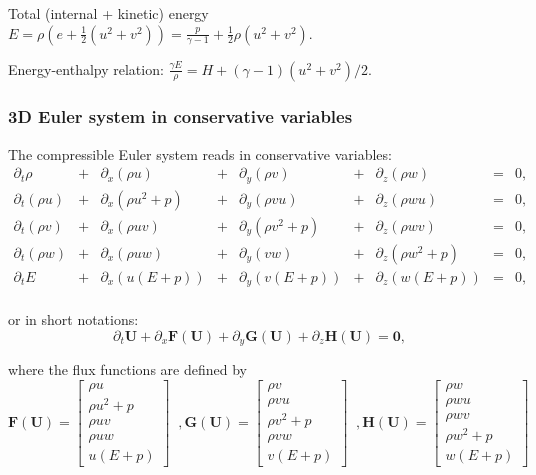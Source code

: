\documentclass{article}
\begin{document}
Total (internal + kinetic) energy $E = \rho \left( e + \frac{1}{2} (u^2+v^2) \right) = \frac{p}{\gamma-1} + \frac{1}{2} \rho (u^2+v^2)$.

Energy-enthalpy relation: $\frac{\gamma E}{\rho}=H+(\gamma-1)(u^2+v^2)/2$.

\subsubsection*{3D Euler system in conservative variables}
The compressible Euler system reads in conservative variables:\\
\begin{equation}
  \begin{array}{ccccccccc}
    \partial_t \rho & + & \partial_x(\rho u) & + & \partial_y(\rho v) & + & \partial_z(\rho w) & = & 0,\\
    \partial_t (\rho u) & + & \partial_x(\rho u^2+p) & + & \partial_y(\rho v u) & + & \partial_z(\rho w u) & = & 0,\\
    \partial_t (\rho v) & + & \partial_x(\rho u v) & + & \partial_y(\rho v^2+p) & + & \partial_z(\rho w v) & = & 0,\\
    \partial_t (\rho w) & + & \partial_x(\rho u w) & + & \partial_y(v w) & + & \partial_z(\rho w^2+p) & = & 0,\\
    \partial_t E & + & \partial_x (u(E+p)) & + & \partial_y (v(E+p)) & + & \partial_z (w(E+p)) & = & 0,\\
  \end{array}
\end{equation}

or in short notations:
\begin{equation*}
  \partial_t \mathbf{U} + \partial_x \mathbf{F(U)} + \partial_y \mathbf{G(U)} + \partial_z \mathbf{H(U)} = \mathbf{0},
\end{equation*}

where the flux functions are defined by
\begin{equation}
  \mathbf{F(U)} = \left [
  \begin{array}{c}
    \rho u \\
    \rho u^2 + p \\
    \rho u v \\
    \rho u w \\
    u (E + p)
  \end{array} \right]
  \;\; ,
  \mathbf{G(U)} = \left [
  \begin{array}{c}
    \rho v \\
    \rho v u \\
    \rho v^2 + p \\
    \rho v w \\
    v (E + p)
  \end{array} \right]
  \;\; ,
  \mathbf{H(U)} = \left [
  \begin{array}{c}
    \rho w \\
    \rho w u \\
    \rho w v \\
    \rho w^2 + p \\
    w (E + p)
  \end{array} \right]
\end{equation}
\end{document}
